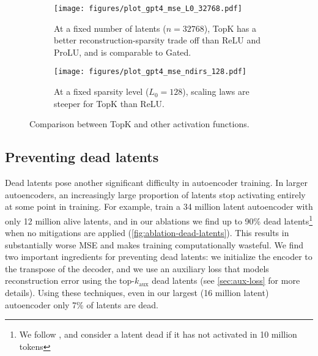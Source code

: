 \begin{figure}[tbp]
\centering
\begin{subfigure}{.48\textwidth}
    \centering
    \texttt{[image: figures/plot\_gpt4\_mse\_L0\_32768.pdf]}
    \caption{At a fixed number of latents ($n=32768$), TopK has a better reconstruction-sparsity trade off than ReLU and ProLU, and is comparable to Gated.}
    \label{fig:relu_vs_topk_a}
\end{subfigure}%
\hspace{10pt}
\begin{subfigure}{.48\textwidth}
    \centering
    \texttt{[image: figures/plot\_gpt4\_mse\_ndirs\_128.pdf]}
    \caption{At a fixed sparsity level ($L_0=128$), scaling laws are steeper for TopK than ReLU.\protect\footnotemark\\}
    \label{fig:relu_vs_topk_b}
\end{subfigure}
\caption{Comparison between TopK and other activation functions.}
\label{fig:relu_vs_topk}
\end{figure}











\vspace{-10pt}
\subsection{Preventing dead latents}

Dead latents pose another significant difficulty in autoencoder training. In larger autoencoders, an increasingly large proportion of latents stop activating entirely at some point in training.  For example, \citet{templeton2024scaling} train a 34 million latent autoencoder with only 12 million alive latents, and in our ablations we find up to 90\% dead latents\footnote{We follow \citet{templeton2024scaling}, and consider a latent dead if it has not activated in 10 million tokens} when no mitigations are applied (\autoref{fig:ablation-dead-latents}).  This results in substantially worse MSE and makes training computationally wasteful.
We find two important ingredients for preventing dead latents: we initialize the encoder to the transpose of the decoder, and we use an auxiliary loss that models reconstruction error using the top-$k_{\text{aux}}$ dead latents (see \autoref{sec:aux-loss} for more details).  Using these techniques, even in our largest (16 million latent) autoencoder only 7\% of latents are dead. 

